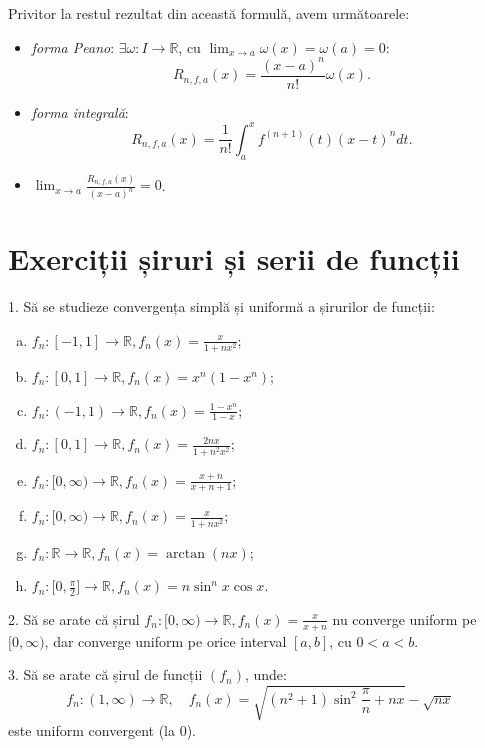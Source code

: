\documentclass[11pt,a4paper]{article}
\newcommand\ds{\displaystyle}
\newcommand\RR{\mathbb{R}}
\theoremstyle{dotless}
\theoremstyle{dotlessdr}
\begin{document}
Privitor la restul rezultat din această formulă, avem următoarele:
\begin{itemize}
\item \emph{forma Peano}: $\exists \omega : I \to \RR$, cu
  $\ds\lim_{x \to a} \omega(x) = \omega(a) = 0$:
  \[
    R_{n, f, a}(x) = \frac{(x - a)^n}{n!} \omega(x).
  \]
\item \emph{forma integrală}:
  \[
    R_{n, f, a}(x) = \frac{1}{n!} \int_a^x f^{(n + 1)}(t) (x - t)^n dt.
  \]
\item $\ds\lim_{x \to a} \frac{R_{n, f, a}(x)}{(x - a)^n} = 0$.
\end{itemize}


\section{Exerciții șiruri și serii de funcții}
\label{sec:exercitii}

1. Să se studieze convergența simplă și uniformă a șirurilor de funcții:
\begin{enumerate}[(a)]
\item $f_n : [-1, 1] \to \RR, f_n(x) = \frac{x}{1 + nx^2}$;
\item $f_n : [0, 1] \to \RR, f_n(x) = x^n(1 - x^n)$;
\item $f_n : (-1, 1) \to \RR, f_n(x) = \frac{1 - x^n}{1 - x}$;
\item $f_n : [0, 1] \to \RR, f_n(x) = \frac{2nx}{1 + n^2 x^2}$;
\item $f_n : [0, \infty) \to \RR, f_n(x) = \frac{x + n}{x + n + 1}$;
\item $f_n : [0, \infty) \to \RR, f_n(x) = \frac{x}{1 + nx^2}$;
\item $f_n : \RR \to \RR, f_n(x) = \arctan (nx)$;
\item $f_n : \big[ 0, \frac{\pi}{2} \big] \to \RR, f_n(x) = n \sin^n x \cos x$.
\end{enumerate}

\vspace{1cm}

2. Să se arate că șirul $f_n : [0, \infty) \to \RR, f_n(x) = \frac{x}{x + n}$ nu converge
uniform pe $[0, \infty)$, dar converge uniform pe orice interval $[a, b]$, cu $0 < a < b$.

\vspace{1cm}

3. Să se arate că șirul de funcții $(f_n)$, unde:
\[
  f_n : (1, \infty) \to \RR, \quad f_n(x) = \sqrt{(n^2 + 1) \sin^2 \frac{\pi}{n} + nx} - \sqrt{nx}
\]
este uniform convergent (la 0).
\end{document}

